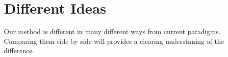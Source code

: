 %


\section{Different Ideas}
Our method is different in many different ways from current paradigms.
Comparing them side by side will provides a clearing understaning of the difference. 

